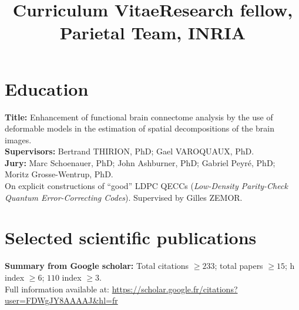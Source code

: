 \documentclass[11pt,a4paper,roman,unicode]{moderncv}
\title{Curriculum Vitae}
\title{Research fellow, Parietal Team, INRIA}
\begin{document}
\maketitle
\section{Education}
{
  \textbf{Title:} Enhancement of functional brain connectome analysis by the use
  of deformable models in the estimation of spatial decompositions of the brain
  images.\\
  \textbf{Supervisors:} Bertrand THIRION, PhD; Gael VAROQUAUX, PhD.\\
  \textbf{Jury:} Marc Schoenauer, PhD; John Ashburner, PhD;
  Gabriel Peyr\'e, PhD; Moritz Grosse-Wentrup, PhD.\\
}
{On explicit constructions of ``good'' LDPC QECCs (\emph{Low-Density
    Parity-Check Quantum Error-Correcting Codes}). Supervised by Gilles ZEMOR.}
{}

\section{Selected scientific publications}
\textbf{Summary from Google scholar:} Total citations $ \ge 233$; total papers $
\ge 15$; h index $ \ge 6$; $110$ index $ \ge 3$.\\
Full information available at:
\url{https://scholar.google.fr/citations?user=FDWgJY8AAAAJ&hl=fr}\\\\

\end{document}
